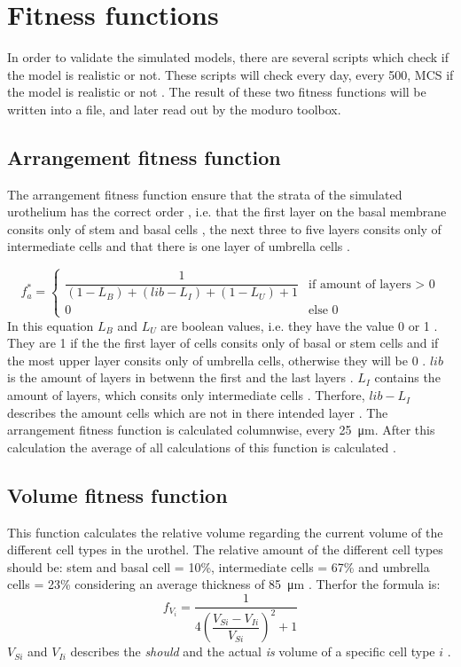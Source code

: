 \section{Fitness functions}
In order to validate the simulated models, there are several scripts which check if the model is realistic or not. These scripts will check every day, every 500, \ac{MCS} if the model is realistic or not \cite{Torelli2017}. The result of these two fitness functions will be written into a file, and later read out by the moduro toolbox.

\subsection{Arrangement fitness function}
The arrangement fitness function ensure that the strata of the simulated urothelium has the correct order \cite{Torelli2017}, i.e. that the first layer on the basal membrane consits only of stem and basal cells \cite{REFS}, the next three to five layers consits only of intermediate cells \cite{REFS} and that there is one layer of umbrella cells \cite{REFS}.

\begin{equation} 
f_{a}^{*} = \begin{cases}
\dfrac{1}{(1-L_{B})+(lib-L_{I})+(1-L_{U})+1} & \text{if amount of layers > 0} \\
0 & \text{else 0}
\end{cases}
\end{equation}
In this equation $L_{B}$ and $L_{U}$ are boolean values, i.e. they have the value 0 or 1 \cite{Torelli2017}. They are 1 if the the first layer of cells consits only of basal or stem cells and if the most upper layer consits only of umbrella cells, otherwise they will be 0 \cite{Torelli2017}.
$lib$ is the amount of layers in betwenn the first and the last layers \cite{Torelli2017}. $L_{I}$ contains the amount of layers, which consits only intermediate cells \cite{Torelli2017}. Therfore, $lib-L_{I}$ describes the amount cells which are not in there intended layer \cite{Torelli2017}. \newline
The arrangement fitness function is calculated columnwise, every \SI{25}{\micro\metre}. After this calculation the average of all calculations of this function is calculated \cite{Torelli2017}.

\subsection{Volume fitness function}
This function calculates the relative volume regarding the current volume of the different cell types in the urothel. The relative amount of the different cell types should be: stem and basal cell = 10\%, intermediate cells = 67\% and umbrella cells = 23\% considering an average thickness of \SI{85}{\micro\metre} \cite{Torelli2017}. Therfor the formula is:
\begin{equation} 
f_{V_{i}} = \dfrac{1}{4 (\dfrac{V_{Si}-V_{Ii}}{V_{Si}})^2 + 1}
\end{equation}
$V_{Si}$ and $V_{Ii}$ describes the \textit{should} and the actual \textit{is} volume of a specific cell type $i$ \cite{Torelli2017}. 

